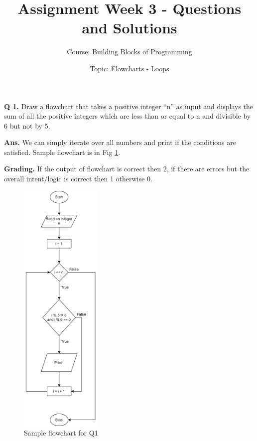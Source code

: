 \documentclass{article}
\title{Assignment Week 3 - Questions and Solutions}
\author{Course: Building Blocks of Programming}
\date{Topic: Flowcharts - Loops}
\begin{document}
\maketitle

\begin{flushleft}

    \textbf{Q 1. } Draw a flowchart that takes a positive integer “n”  as input and 
    displays the sum of all the positive integers which are less than or equal to n 
    and divisible by 6 but not by 5.
    
    \end{flushleft}
    
    \begin{flushleft}
    
    \textbf{Ans. } We can simply iterate over all numbers and print if the conditions
    are satisfied. Sample flowchart is in Fig \ref{Q1}.
    
    \end{flushleft}
    
    \begin{flushleft}
    
    \textbf{Grading. } If the output of flowchart is correct then 2, if there are 
    errors but the overall intent/logic is correct then 1 otherwise 0.
    
\end{flushleft}
    
    \begin{figure}[ht]
        \centering
        \includegraphics[width=0.35\textwidth]{Q1.png}
        \caption{Sample flowchart for Q1}
        \label{Q1}
    \end{figure}
    
\end{document}
